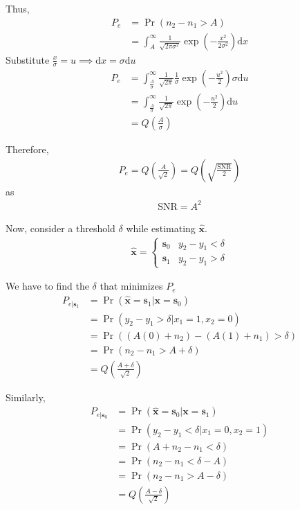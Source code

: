 \documentclass[journal,12pt,twocolumn]{IEEEtran}
\providecommand{\pr}[1]{\ensuremath{\Pr\left(#1\right)}}
\providecommand{\brak}[1]{\ensuremath{\left(#1\right)}}
\providecommand{\der}[1]{\mathrm{d} #1}
\let\vec\mathbf
\numberwithin{equation}{section}
\renewcommand\thesection{\arabic{section}}
\begin{document}
\begin{enumerate}[label=\thesection.\arabic*,ref=\thesection.\theenumi]
	Thus,
	\begin{align}
		P_e &= \pr{n_2 - n_1 > A} \\
		&= \int_A^{\infty} \frac{1}{\sqrt{2\pi\sigma^2}} \exp\brak{-\frac{x^2}{2\sigma^2}} \der{x}
	\end{align}
	Substitute $\frac{x}{\sigma} = u \implies \der{x} = \sigma \der{u}$
	\begin{align}
		P_e &= \int_{\frac{A}{\sigma}}^{\infty} \frac{1}{\sqrt{2\pi}} \frac{1}{\sigma}  \exp\brak{-\frac{u^2}{2}} \sigma \der{u} \\
		&= \int_{\frac{A}{\sigma}}^{\infty} \frac{1}{\sqrt{2\pi}} \exp\brak{-\frac{u^2}{2}} \der{u} \\
		&= Q\brak{\frac{A}{\sigma}}
	\end{align}
	
	Therefore,
	\begin{align}
		P_e = Q\brak{\frac{A}{\sqrt{2}}} = Q\brak{\sqrt{\frac{\text{SNR}}{2}}}
	\end{align}
	as 
	\begin{align}
		\text{SNR} = A^2
	\end{align}
	
	Now, consider a threshold $\delta$ while estimating $\hat{\vec{x}}$. 
	\begin{align}
		\hat{\vec{x}} = 
		\begin{cases}
			\vec{s}_0 & y_2 - y_1 < \delta \\
			\vec{s}_1 & y_2 - y_1 > \delta
		\end{cases}
	\end{align}
	
	We have to find the $\delta$ that minimizes $P_e$
	\begin{align}
		P_{e|\vec{s}_1} &= \pr{\hat{\vec{x}} = \vec{s}_1|\vec{x} = \vec{s}_0} \\
		&= \pr{y_2 - y_1 > \delta|x_1 = 1, x_2=0} \\
		&= \pr{(A(0)+n_2) - (A(1)+n_1) > \delta } \\
		&= \pr{n_2 - n_1 > A + \delta} \\
		&= Q\brak{\frac{A+\delta}{\sqrt{2}}}
	\end{align}
	
	Similarly,
	\begin{align}
		P_{e|\vec{s}_0} &= \pr{\hat{\vec{x}} = \vec{s}_0|\vec{x} = \vec{s}_1} \\
		&= \pr{y_2 - y_1 < \delta|x_1 = 0, x_2=1} \\
		&= \pr{A + n_2 - n_1 < \delta} \\
		&= \pr{n_2 - n_1 < \delta - A} \\
		&= \pr{n_2 - n_1 > A-\delta} \\
		&= Q\brak{\frac{A-\delta}{\sqrt{2}}}
	\end{align}


\end{enumerate}
\end{document}
